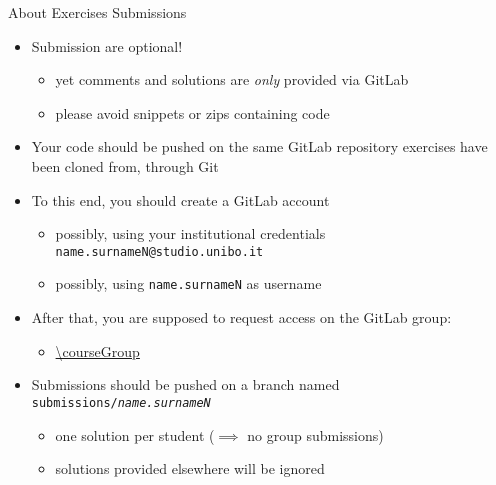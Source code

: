 \documentclass[presentation]{beamer}\mode<presentation>{\usetheme{AMSBolognaFC}}
\begin{document}
\begin{frame}[c,allowframebreaks]{About Exercises Submissions}
\label{slide:submissions}

    \begin{itemize}
		\item Submission are optional!
        \begin{itemize}
            \item yet comments and solutions are \emph{only} provided via GitLab
            \item please avoid snippets or zips containing code
        \end{itemize}

		\bigskip

        \item Your code should be pushed on the same GitLab repository exercises have been cloned from, \alert{through Git}

        \bigskip

        \item To this end, you should create a GitLab account %
        \begin{itemize}
            \item possibly, using your institutional credentials \texttt{\alert{name.surnameN}@studio.unibo.it}
            \item possibly, using \texttt{\alert{name.surnameN}} as username
        \end{itemize}

        \framebreak

        \item After that, you are supposed to request access on the \courseAcronym{} \academicYearShort{} GitLab group:
        \begin{itemize}
            \item \url{\courseGroup}
        \end{itemize}

        \bigskip

        \item Submissions should be pushed on a branch named \alert{\texttt{submissions/\textit{name.surnameN}}} %
        \begin{itemize}
            \item one solution per student ($\implies$ no group submissions)
            \item solutions provided elsewhere will be ignored
        \end{itemize}
    \end{itemize}
\end{frame}
\end{document}
